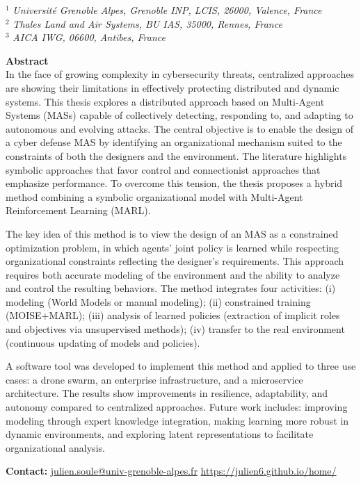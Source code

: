\documentclass[12pt,a4paper]{article}
\begin{document}
\begin{center}
    {\footnotesize $^{1}$ \textit{Université Grenoble Alpes, Grenoble INP, LCIS, 26000, Valence, France}}\\[0.1cm]
    {\footnotesize $^{2}$ \textit{Thales Land and Air Systems, BU IAS, 35000, Rennes, France}}\\[0.1cm]
    {\footnotesize $^{3}$ \textit{AICA IWG, 06600, Antibes, France}}\\[1cm]
\end{center}


\noindent\textbf{Abstract}\\[0.3cm]
\justifying
In the face of growing complexity in cybersecurity threats, centralized approaches are showing their limitations in effectively protecting distributed and dynamic systems.
This thesis explores a distributed approach based on Multi-Agent Systems (MASs) capable of collectively detecting, responding to, and adapting to autonomous and evolving attacks.
The central objective is to enable the design of a cyber defense MAS by identifying an organizational mechanism suited to the constraints of both the designers and the environment.
The literature highlights symbolic approaches that favor control and connectionist approaches that emphasize performance.
To overcome this tension, the thesis proposes a hybrid method combining a symbolic organizational model with Multi-Agent Reinforcement Learning (MARL).

\medskip
The key idea of this method is to view the design of an MAS as a constrained optimization problem,
in which agents' joint policy is learned while respecting organizational constraints reflecting the designer’s requirements.
This approach requires both accurate modeling of the environment and the ability to analyze and control the resulting behaviors.
The method integrates four activities:
(i) modeling (World Models or manual modeling);
(ii) constrained training (MOISE+MARL);
(iii) analysis of learned policies (extraction of implicit roles and objectives via unsupervised methods);
(iv) transfer to the real environment (continuous updating of models and policies).

\medskip
A software tool was developed to implement this method and applied to three use cases:
a drone swarm, an enterprise infrastructure, and a microservice architecture.
The results show improvements in resilience, adaptability, and autonomy compared to centralized approaches.
Future work includes: improving modeling through expert knowledge integration,
making learning more robust in dynamic environments,
and exploring latent representations to facilitate organizational analysis.

\vfill

\noindent\textbf{Contact:} \href{mailto:julien.soule@univ-grenoble-alpes.fr}{julien.soule@univ-grenoble-alpes.fr}
\hfill
\href{https://julien6.github.io/home/}{\textrm{\faGlobe}\;https://julien6.github.io/home/}
\end{document}
